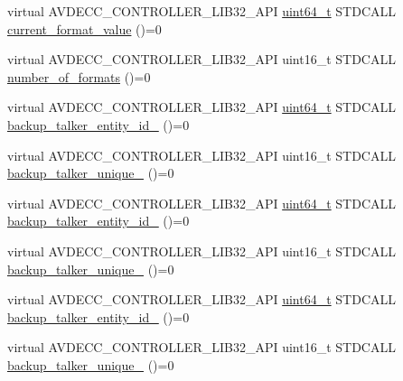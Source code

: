 \begin{DoxyCompactItemize}
\item 
virtual A\+V\+D\+E\+C\+C\+\_\+\+C\+O\+N\+T\+R\+O\+L\+L\+E\+R\+\_\+\+L\+I\+B32\+\_\+\+A\+PI \hyperlink{parse_8c_aec6fcb673ff035718c238c8c9d544c47}{uint64\+\_\+t} S\+T\+D\+C\+A\+LL \hyperlink{classavdecc__lib_1_1stream__output__descriptor__response_a6fded21e06a52c7031a0ce0b6f306ca0}{current\+\_\+format\+\_\+value} ()=0
\item 
virtual A\+V\+D\+E\+C\+C\+\_\+\+C\+O\+N\+T\+R\+O\+L\+L\+E\+R\+\_\+\+L\+I\+B32\+\_\+\+A\+PI uint16\+\_\+t S\+T\+D\+C\+A\+LL \hyperlink{classavdecc__lib_1_1stream__output__descriptor__response_a55d221ca29bf6acce7d7031b811bae01}{number\+\_\+of\+\_\+formats} ()=0
\item 
virtual A\+V\+D\+E\+C\+C\+\_\+\+C\+O\+N\+T\+R\+O\+L\+L\+E\+R\+\_\+\+L\+I\+B32\+\_\+\+A\+PI \hyperlink{parse_8c_aec6fcb673ff035718c238c8c9d544c47}{uint64\+\_\+t} S\+T\+D\+C\+A\+LL \hyperlink{classavdecc__lib_1_1stream__output__descriptor__response_acd4fa01e575dfb7160afc66a7cdffcc6}{backup\+\_\+talker\+\_\+entity\+\_\+id\+\_} ()=0
\item 
virtual A\+V\+D\+E\+C\+C\+\_\+\+C\+O\+N\+T\+R\+O\+L\+L\+E\+R\+\_\+\+L\+I\+B32\+\_\+\+A\+PI uint16\+\_\+t S\+T\+D\+C\+A\+LL \hyperlink{classavdecc__lib_1_1stream__output__descriptor__response_acae31dc43b38d6c49acb2db4c8c23b8c}{backup\+\_\+talker\+\_\+unique\+\_} ()=0
\item 
virtual A\+V\+D\+E\+C\+C\+\_\+\+C\+O\+N\+T\+R\+O\+L\+L\+E\+R\+\_\+\+L\+I\+B32\+\_\+\+A\+PI \hyperlink{parse_8c_aec6fcb673ff035718c238c8c9d544c47}{uint64\+\_\+t} S\+T\+D\+C\+A\+LL \hyperlink{classavdecc__lib_1_1stream__output__descriptor__response_af3e6b600303fa7833e2033ee228c751a}{backup\+\_\+talker\+\_\+entity\+\_\+id\+\_} ()=0
\item 
virtual A\+V\+D\+E\+C\+C\+\_\+\+C\+O\+N\+T\+R\+O\+L\+L\+E\+R\+\_\+\+L\+I\+B32\+\_\+\+A\+PI uint16\+\_\+t S\+T\+D\+C\+A\+LL \hyperlink{classavdecc__lib_1_1stream__output__descriptor__response_a99963ab0e34ebf72203e8d20e8de1ab1}{backup\+\_\+talker\+\_\+unique\+\_} ()=0
\item 
virtual A\+V\+D\+E\+C\+C\+\_\+\+C\+O\+N\+T\+R\+O\+L\+L\+E\+R\+\_\+\+L\+I\+B32\+\_\+\+A\+PI \hyperlink{parse_8c_aec6fcb673ff035718c238c8c9d544c47}{uint64\+\_\+t} S\+T\+D\+C\+A\+LL \hyperlink{classavdecc__lib_1_1stream__output__descriptor__response_a76daa1a16a93fd2abd3613bea816af5f}{backup\+\_\+talker\+\_\+entity\+\_\+id\+\_} ()=0
\item 
virtual A\+V\+D\+E\+C\+C\+\_\+\+C\+O\+N\+T\+R\+O\+L\+L\+E\+R\+\_\+\+L\+I\+B32\+\_\+\+A\+PI uint16\+\_\+t S\+T\+D\+C\+A\+LL \hyperlink{classavdecc__lib_1_1stream__output__descriptor__response_a6c91e59896d8e1d08c3cf676a78caa53}{backup\+\_\+talker\+\_\+unique\+\_} ()=0

\end{DoxyCompactItemize}

